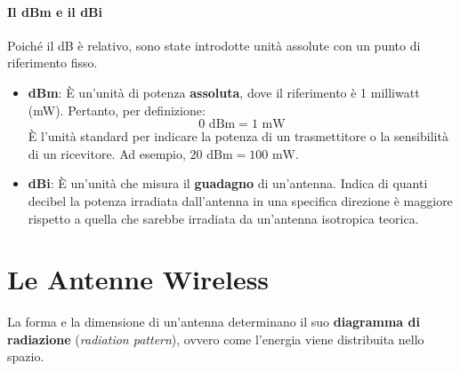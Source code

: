 
\paragraph{Il dBm e il dBi}
Poiché il dB è relativo, sono state introdotte unità assolute con un punto di riferimento fisso.
\begin{itemize}
    \item \textbf{dBm}: È un'unità di potenza \textbf{assoluta}, dove il riferimento è 1 milliwatt (mW). Pertanto, per definizione:
    $$ 0 \text{ dBm} = 1 \text{ mW} $$
    È l'unità standard per indicare la potenza di un trasmettitore o la sensibilità di un ricevitore. Ad esempio, $20 \text{ dBm} = 100 \text{ mW}$.
    \item \textbf{dBi}: È un'unità che misura il \textbf{guadagno} di un'antenna. Indica di quanti decibel la potenza irradiata dall'antenna in una specifica direzione è maggiore rispetto a quella che sarebbe irradiata da un'antenna isotropica teorica.
\end{itemize}

\section{Le Antenne Wireless}


La forma e la dimensione di un'antenna determinano il suo \textbf{diagramma di radiazione} (\textit{radiation pattern}), ovvero come l'energia viene distribuita nello spazio.

